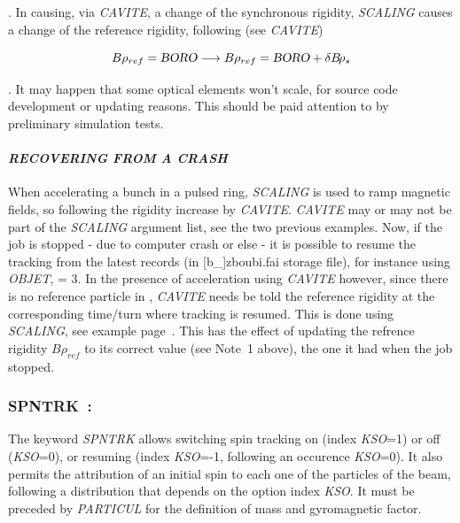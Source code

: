\bigskip


\medskip

. In causing, via \textsl{CAVITE}, a change of the synchronous rigidity, \textsl{SCALING} causes 
a change of the reference rigidity, following (see \textsl{CAVITE})     

$$B\rho_{ref} = \textsl{BORO} \longrightarrow B\rho_{ref} = \textsl{BORO} + \delta B\!\rho_s$$ 


\medskip

. It may happen that some optical elements won't scale, for source code development or updating reasons. 
This should be paid attention to by preliminary simulation tests. 


\paragraph{\textit{RECOVERING FROM A CRASH}} \label{CrashSCALING}

\noindent When accelerating a bunch in a pulsed ring, \textsl{SCALING} is used to ramp magnetic fields, 
so following the rigidity increase by  \textsl{CAVITE}.  \textsl{CAVITE} may or may not be part of the \textsl{SCALING}
argument list, see the two previous examples. 
Now, if the job is stopped - due to computer crash or else -  it is possible to resume the tracking 
from the latest records (in [b\_]zboubi.fai storage file), for instance using \textsl{OBJET}, \KOBJ = 3.
In the presence of acceleration using \textsl{CAVITE} however,  since there is no reference particle in \zgou, 
  \textsl{CAVITE}  needs be told the reference rigidity at the corresponding time/turn where tracking is resumed. 
This is done using \textsl{SCALING}, see example page~\pageref{ExaOBJ3Recovery}. This has the effect of updating 
the refrence rigidity $B\rho_{ref}$ to its correct value (see Note~1 above), the one it had when the job stopped. 






\newpage

\subsubsection*{SPNTRK~: \SPNTRKTitl} \label{SPNTRK} 
\medskip

The keyword \textsl{SPNTRK} allows switching  spin tracking on (index \textsl{KSO}=1) or off (\textsl{KSO}=0), 
or resuming (index \textsl{KSO}=-1, following an occurence \textsl{KSO}=0). 
 It also permits the attribution of an initial spin to each one of the 
\IMAX{} particles of the beam, following a distribution that depends 
on the option index \textsl{KSO}. It must be preceded by \textsl{PARTICUL} for
the definition of  mass and gyromagnetic factor.  
\medskip

